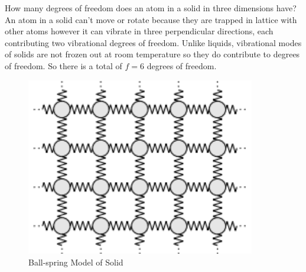 \begin{texample}
	How many degrees of freedom does an atom in a solid in three dimensions have? \\
	
	An atom in a solid can't move or rotate because they are trapped in lattice with other atoms however it can vibrate in three perpendicular directions, each contributing two vibrational degrees of freedom. Unlike liquids, vibrational modes of solids are not frozen out at room temperature so they do contribute to degrees of freedom. So there is a total of $f=6$ degrees of freedom.
	
	\begin{figure}[H]
		\centering
		\includegraphics[width=100mm]{20.png}
		\caption{Ball-spring Model of Solid}
	\end{figure}
\end{texample}

